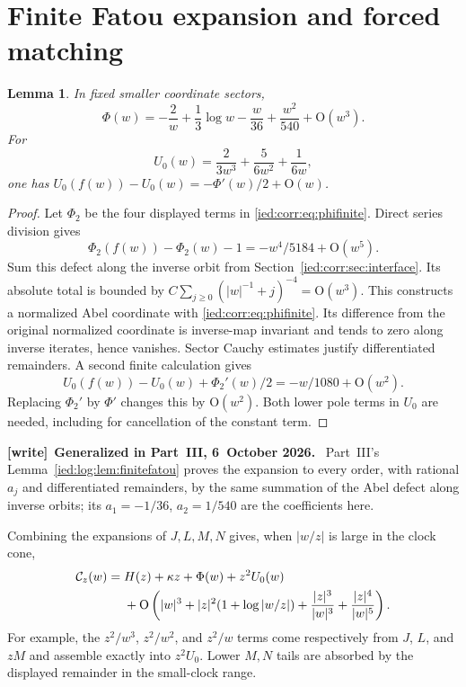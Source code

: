 \documentclass[11pt,letterpaper]{article}
\newtheorem{lemma}[theorem]{Lemma}
\theoremstyle{remark}\newtheorem{remark}[theorem]{Remark}
\newcommand{\Oh}{\mathrm O}\newcommand{\supp}{\operatorname{supp}}
\newenvironment{writenote}[1][]{\par\smallskip\begingroup\small
 \noindent\textbf{[write]}\if\relax\detokenize{#1}\relax\else~\textbf{#1.}\fi\ }%
 {\par\endgroup\smallskip}
\begin{document}
\section{Finite Fatou expansion and forced matching}\label{ied:corr:sec:fatou}
\begin{lemma}\label{ied:corr:lem:fatoufinite}
In fixed smaller coordinate sectors,
\begin{equation}\label{ied:corr:eq:phifinite}
 \Phi(w)=-\frac2w+\frac13\log w-\frac w{36}+\frac{w^2}{540}+\Oh(w^3).
\end{equation}
For
\begin{equation}\label{ied:corr:eq:U}
 U_0(w)=\frac2{3w^3}+\frac5{6w^2}+\frac1{6w},
\end{equation}
one has $U_0(f(w))-U_0(w)=-\Phi'(w)/2+\Oh(w)$.
\end{lemma}
\begin{proof}
Let $\Phi_2$ be the four displayed terms in \eqref{ied:corr:eq:phifinite}. Direct series division gives
\[
 \Phi_2(f(w))-\Phi_2(w)-1=-w^4/5184+\Oh(w^5).
\]
Sum this defect along the inverse orbit from Section~\ref{ied:corr:sec:interface}. Its absolute total is bounded by
$C\sum_{j\ge0}(|w|^{-1}+j)^{-4}=\Oh(w^3)$. This constructs a normalized Abel coordinate with \eqref{ied:corr:eq:phifinite}. Its difference from the original normalized coordinate is inverse-map invariant and tends to zero along inverse iterates, hence vanishes. Sector Cauchy estimates justify differentiated remainders. A second finite calculation gives
\[
 U_0(f(w))-U_0(w)+\Phi_2'(w)/2=-w/1080+\Oh(w^2).
\]
Replacing $\Phi_2'$ by $\Phi'$ changes this by $\Oh(w^2)$. Both lower pole terms in $U_0$ are needed, including for cancellation of the constant term.
\end{proof}

\begin{writenote}[Generalized in Part~III, 6~October 2026]
Part~III's Lemma~\ref{ied:log:lem:finitefatou} proves the expansion to every order, with rational $a_j$ and differentiated remainders, by the same summation of the Abel defect along inverse orbits; its $a_1=-1/36$, $a_2=1/540$ are the coefficients here.
\end{writenote}

Combining the expansions of $J,L,M,N$ gives, when $|w/z|$ is large in the clock cone,
\begin{align}\label{ied:corr:eq:newmatch}
 \mathcal C_z(w)={}&H(z)+\kappa z+\Phi(w)+z^2U_0(w)\notag\\
 &+\Oh\left(|w|^3+|z|^2(1+\log|w/z|)
                +\frac{|z|^3}{|w|^3}+\frac{|z|^4}{|w|^5}\right).
\end{align}
For example, the $z^2/w^3$, $z^2/w^2$, and $z^2/w$ terms come respectively from $J$, $L$, and $zM$ and assemble exactly into $z^2U_0$. Lower $M,N$ tails are absorbed by the displayed remainder in the small-clock range.
\end{document}
